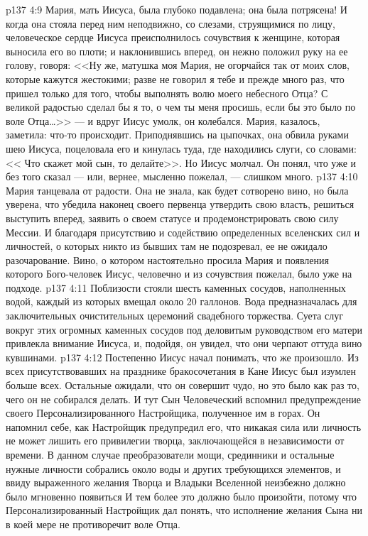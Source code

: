 \vs p137 4:9 Мария, мать Иисуса, была глубоко подавлена; она была потрясена! И когда она стояла перед ним неподвижно, со слезами, струящимися по лицу, человеческое сердце Иисуса преисполнилось сочувствия к женщине, которая выносила его во плоти; и наклонившись вперед, он нежно положил руку на ее голову, говоря: <<Ну же, матушка моя Мария, не огорчайся так от моих слов, которые кажутся жестокими; разве не говорил я тебе и прежде много раз, что пришел только для того, чтобы выполнять волю моего небесного Отца? С великой радостью сделал бы я то, о чем ты меня просишь, если бы это было по воле Отца\ldots >> --- и вдруг Иисус умолк, он колебался. Мария, казалось, заметила: что\hyp{}то происходит. Приподнявшись на цыпочках, она обвила руками шею Иисуса, поцеловала его и кинулась туда, где находились слуги, со словами: << Что скажет мой сын, то делайте>>. Но Иисус молчал. Он понял, что уже и без того сказал --- или, вернее, мысленно пожелал, --- слишком много.
\vs p137 4:10 Мария танцевала от радости. Она не знала, как будет сотворено вино, но была уверена, что убедила наконец своего первенца утвердить свою власть, решиться выступить вперед, заявить о своем статусе и продемонстрировать свою силу Мессии. И благодаря присутствию и содействию определенных вселенских сил и личностей, о которых никто из бывших там не подозревал, ее не ожидало разочарование. Вино, о котором настоятельно просила Мария и появления которого Бого\hyp{}человек Иисус, человечно и из сочувствия пожелал, было уже на подходе.
\vs p137 4:11 Поблизости стояли шесть каменных сосудов, наполненных водой, каждый из которых вмещал около 20 галлонов. Вода предназначалась для заключительных очистительных церемоний свадебного торжества. Суета слуг вокруг этих огромных каменных сосудов под деловитым руководством его матери привлекла внимание Иисуса, и, подойдя, он увидел, что они черпают оттуда вино кувшинами.
\vs p137 4:12 Постепенно Иисус начал понимать, что же произошло. Из всех присутствовавших на празднике бракосочетания в Кане Иисус был изумлен больше всех. Остальные ожидали, что он совершит чудо, но это было как раз то, чего он не собирался делать. И тут Сын Человеческий вспомнил предупреждение своего Персонализированного Настройщика, полученное им в горах. Он напомнил себе, как Настройщик предупредил его, что никакая сила или личность не может лишить его привилегии творца, заключающейся в независимости от времени. В данном случае преобразователи мощи, срединники и остальные нужные личности собрались около воды и других требующихся элементов, и ввиду выраженного желания Творца и Владыки Вселенной неизбежно должно было мгновенно появиться  И тем более это должно было произойти, потому что Персонализированный Настройщик дал понять, что исполнение желания Сына ни в коей мере не противоречит воле Отца.
